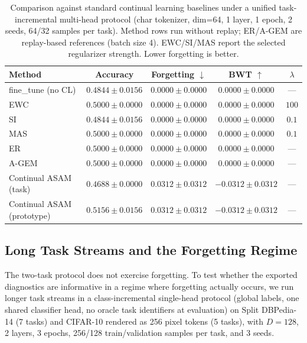 \documentclass[11pt,a4paper]{article}
\theoremstyle{definition}
\begin{document}
\begin{table}[t]
\centering
\caption{Comparison against standard continual learning baselines under a unified task-incremental multi-head protocol (char tokenizer, dim=64, 1 layer, 1 epoch, 2 seeds, 64/32 samples per task). Method rows run without replay; ER/A-GEM are replay-based references (batch size 4). EWC/SI/MAS report the selected regularizer strength. Lower forgetting is better.}
\label{tab:baseline_comparison}
\begin{tabular}{lcccc}
\toprule
\textbf{Method} & \textbf{Accuracy} & \textbf{Forgetting} $\downarrow$ & \textbf{BWT} $\uparrow$ & $\lambda$ \\
\midrule
fine\_tune (no CL) & $0.4844 \pm 0.0156$ & $0.0000 \pm 0.0000$ & $0.0000 \pm 0.0000$ & --- \\
EWC & $0.5000 \pm 0.0000$ & $0.0000 \pm 0.0000$ & $0.0000 \pm 0.0000$ & $100$ \\
SI & $0.4844 \pm 0.0156$ & $0.0000 \pm 0.0000$ & $0.0000 \pm 0.0000$ & $0.1$ \\
MAS & $0.5000 \pm 0.0000$ & $0.0000 \pm 0.0000$ & $0.0000 \pm 0.0000$ & $0.1$ \\
ER & $0.5000 \pm 0.0000$ & $0.0000 \pm 0.0000$ & $0.0000 \pm 0.0000$ & --- \\
A-GEM & $0.5000 \pm 0.0000$ & $0.0000 \pm 0.0000$ & $0.0000 \pm 0.0000$ & --- \\
Continual ASAM (task) & $0.4688 \pm 0.0000$ & $0.0312 \pm 0.0312$ & $-0.0312 \pm 0.0312$ & --- \\
Continual ASAM (prototype) & $\mathbf{0.5156} \pm \mathbf{0.0156}$ & $0.0312 \pm 0.0312$ & $-0.0312 \pm 0.0312$ & --- \\
\bottomrule
\end{tabular}
\end{table}

\subsection{Long Task Streams and the Forgetting Regime}
\label{sec:longstream}

The two-task protocol does not exercise forgetting. To test whether the exported diagnostics are informative in a regime where forgetting actually occurs, we run longer task streams in a class-incremental single-head protocol (global labels, one shared classifier head, no oracle task identifiers at evaluation) on Split DBPedia-14 (7 tasks) and CIFAR-10 rendered as 256 pixel tokens (5 tasks), with $D=128$, 2 layers, 3 epochs, 256/128 train/validation samples per task, and 3 seeds.
\end{document}

